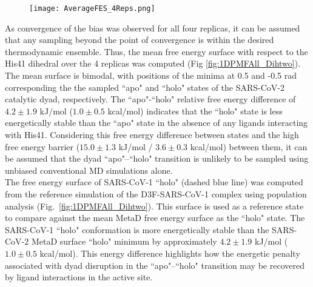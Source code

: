 \begin{figure}[!h]
    \centering
    \texttt{[image: AverageFES\_4Reps.png]}
    \caption{}
    \label{fig:AverageFES}
\end{figure}

As convergence of the bias was observed for all four replicas, it can be assumed that any sampling beyond the point of convergence is within the desired thermodynamic ensemble. Thus, the mean free energy surface with respect to the His41 \dihtwo dihedral over the 4 replicas was computed (Fig \ref{fig:1DPMFAll_Dihtwo}). The mean surface is bimodal, with positions of the minima at 0.5 and -0.5 rad corresponding the the sampled ``apo" and ``holo" states of the SARS-CoV-2 \mpro catalytic dyad, respectively. The ``apo"-``holo" relative free energy difference of $4.2 \pm 1.9$ kJ/mol ($1.0 \pm 0.5$ kcal/mol) indicates that the ``holo" state is less energetically stable than the ``apo" state in the absence of any ligands interacting with His41. Considering this free energy difference between states and the high free energy barrier ($15.0 \pm 1.3$ kJ/mol / $3.6 \pm 0.3$ kcal/mol) between them, it can be assumed that the dyad ``apo"--``holo" transition is unlikely to be sampled using unbiased conventional MD simulations alone.\\

The free energy surface of SARS-CoV-1 ``holo" (dashed blue line) was computed from the reference simulation of the D3F-SARS-CoV-1 \mpro complex using population analysis (Fig.~\ref{fig:1DPMFAll_Dihtwo}). This surface is used as a reference state to compare against the mean MetaD free energy surface as the ``holo" state. The SARS-CoV-1 ``holo" conformation is more energetically stable than the SARS-CoV-2 MetaD surface ``holo" minimum by approximately $4.2 \pm 1.9$ kJ/mol ($1.0 \pm 0.5$ kcal/mol). This energy difference highlights how the energetic penalty associated with dyad disruption in the ``apo"--``holo" transition may be recovered by ligand interactions in the active site. \\

